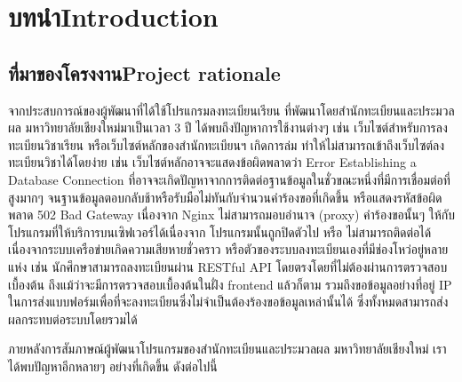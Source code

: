 \chapter{\ifcpe บทนำ\else Introduction\fi}
\label{ch:intro}

\section{\ifcpe ที่มาของโครงงาน\else Project rationale\fi}

จากประสบการณ์ของผู้พัฒนาที่ได้ใช้โปรแกรมลงทะเบียนเรียน ที่พัฒนาโดยสำนักทะเบียนและประมวลผล มหาวิทยาลัยเชียงใหม่มาเป็นเวลา 3 ปี ได้พบถึงปัญหาการใช้งานต่างๆ เช่น เว็บไซต์สำหรับการลงทะเบียนวิชาเรียน หรือเว็บไซต์หลักของสำนักทะเบียนฯ เกิดการล่ม 
ทำให้ไม่สามารถเข้าถึงเว็บไซต์ลงทะเบียนวิชาได้โดยง่าย เช่น เว็บไซต์หลักอาจจะแสดงข้อผิดพลาดว่า Error Establishing a Database Connection ที่อาจจะเกิดปัญหาจากการติดต่อฐานข้อมูลในชั่วขณะหนึ่งที่มีการเชื่อมต่อที่สูงมากๆ จนฐานข้อมูลตอบกลับช้าหรือรับมือไม่ทันกับจำนวนคำร้องขอที่เกิดขึ้น หรือแสดงรหัสข้อผิดพลาด 502 Bad Gateway เนื่องจาก Nginx ไม่สามารถมอบอำนาจ (proxy) คำร้องขอนั้นๆ ให้กับโปรแกรมที่ให้บริการบนเซิฟเวอร์ได้เนื่องจาก โปรแกรมนั้นถูกปิดตัวไป หรือ ไม่สามารถติดต่อได้เนื่องจากระบบเครือข่ายเกิดความเสียหายชั่วคราว หรือตัวของระบบลงทะเบียนเองที่มีช่องโหว่อยู่หลายแห่ง เช่น นักศึกษาสามารถลงทะเบียนผ่าน RESTful API โดยตรงโดยที่ไม่ต้องผ่านการตรวจสอบเบื้องต้น ถึงแม้ว่าจะมีการตรวจสอบเบื้องต้นในฝั่ง frontend แล้วก็ตาม รวมถึงขอข้อมูลอย่างที่อยู่ IP ในการส่งแบบฟอร์มเพื่อที่จะลงทะเบียนซึ่งไม่จำเป็นต้องร้องขอข้อมูลเหล่านั้นได้ ซึ่งทั้งหมดสามารถส่งผลกระทบต่อระบบโดยรวมได้

ภายหลังการสัมภาษณ์ผู้พัฒนาโปรแกรมของสำนักทะเบียนและประมวลผล มหาวิทยาลัยเชียงใหม่ เราได้พบปัญหาอีกหลายๆ อย่างที่เกิดขึ้น ดังต่อไปนี้

